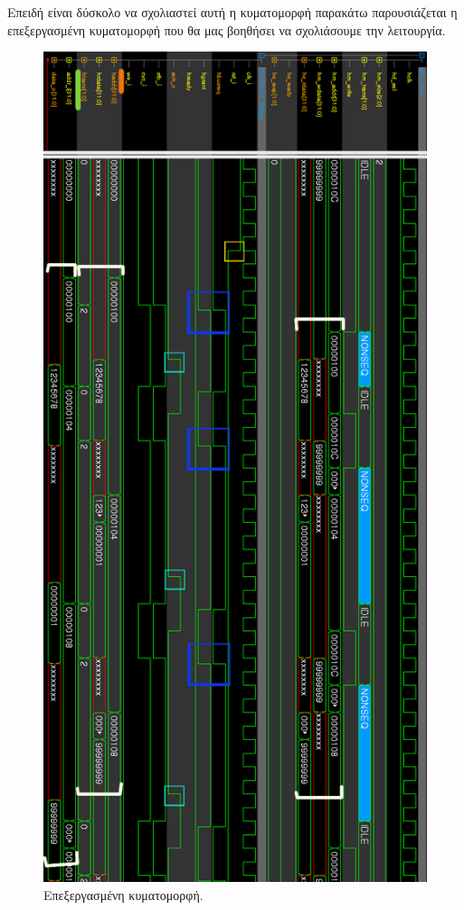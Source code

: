 \documentclass[a4paper,10pt]{article}
\numberwithin{figure}{section}
\numberwithin{table}{section}
\begin{document}
\newpage

Επειδή είναι δύσκολο να σχολιαστεί αυτή η κυματομορφή παρακάτω παρουσιάζεται η επεξεργασμένη κυματομορφή που θα μας βοηθήσει να σχολιάσουμε την λειτουργία.

\begin{figure}[h!]
 \centering
 \includegraphics[bb=0 0 665 1437,scale=0.3]{./Images/waves_I_BR_FINAL1.png}
 \caption{Επεξεργασμένη κυματομορφή.}
\end{figure}
\end{document}
